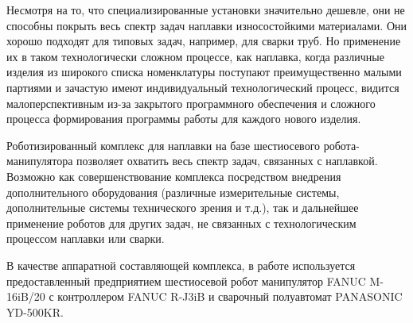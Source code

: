Несмотря на то, что специализированные установки значительно дешевле, они не способны покрыть весь спектр задач наплавки износостойкими материалами.
Они хорошо подходят для типовых задач, например, для сварки труб.
Но применение их в таком технологически сложном процессе, как наплавка, когда различные изделия из широкого списка номенклатуры поступают преимущественно малыми партиями и зачастую имеют индивидуальный технологический процесс, видится малоперспективным из-за закрытого программного обеспечения и сложного процесса формирования программы работы для каждого нового изделия.

Роботизированный комплекс для наплавки на базе шестиосевого робота-манипулятора позволяет охватить весь спектр задач, связанных с наплавкой.
Возможно как совершенствование комплекса посредством внедрения дополнительного оборудования (различные измерительные системы, дополнительные системы технического зрения и т.д.), так и дальнейшее применение роботов для других задач, не связанных с технологическим процессом наплавки или сварки.

В качестве аппаратной составляющей комплекса, в работе используется предоставленный предприятием шестиосевой робот манипулятор FANUC M-16iB/20 с контроллером FANUC R-J3iB и сварочный полуавтомат PANASONIC YD-500KR.
